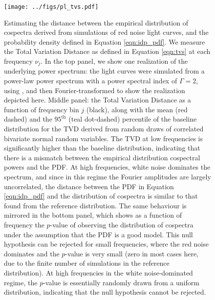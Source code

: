 \documentclass[fleqn,usenatbib]{mnras}
\begin{document}
\begin{figure}
\begin{center}
\texttt{[image: ../figs/pl\_tvs.pdf]}
\caption{Estimating the distance between the empirical distribution of cospectra derived from simulations of red noise light curves, and the probability density defined in Equation \ref{eqn:idp_pdf}. We measure the Total Variation Distance as defined in Equation \ref{eqn:tvs} at each frequency $\nu_j$. In the top panel, we show one realization of the underlying power spectrum: the light curves were simulated from a power-law power spectrum with a power spectral index of $\Gamma = 2$, using \citet{timmer1995}, and then Fourier-transformed to show the realization depicted here. Middle panel: the Total Variation Distance as a function of frequency bin $j$ (black), along with the mean (red dashed) and the $95^{\mathrm{th}}$ (teal dot-dashed) percentile of the baseline distribution for the TVD derived from random draws of correlated bivariate normal random variables. The TVD at low frequencies is significantly higher than the baseline distribution, indicating that there is a mismatch between the empirical distribution cospectral powers and the PDF. At high frequencies, white noise dominates the spectrum, and since in this regime the Fourier amplitudes are largely uncorrelated, the distance between the PDF in Equation \ref{eqn:idp_pdf} and the distribution of cospectra is similar to that found from the reference distribution. The same behaviour is mirrored in the bottom panel, which shows as a function of frequency the $p$-value of observing the distribution of cospectra under the assumption that the PDF is a good model. This null hypothesis can be rejected for small frequencies, where the red noise dominates and the $p$-value is very small (zero in most cases here, due to the finite number of simulations in the reference distribution). At high frequencies in the white noise-dominated regime, the $p$-value is essentially randomly drawn from a uniform distribution, indicating that the null hypothesis cannot be rejected.}
\label{fig:tvs}
\end{center}
\end{figure}
\end{document}
